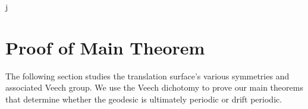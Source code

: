 j\documentclass[]{article}
\newtheorem{Def}{Definition}[subsection]
\newcommand{\compat}[1]{\textbf{\textcolor{red}{#1}}}
\begin{document}
%
%
%
%
%
%

\section{Proof of Main Theorem}
The following section studies the translation surface's various symmetries and associated Veech group. We use the Veech dichotomy to prove our main theorems that determine whether the geodesic is ultimately periodic or drift periodic.
\end{document}
